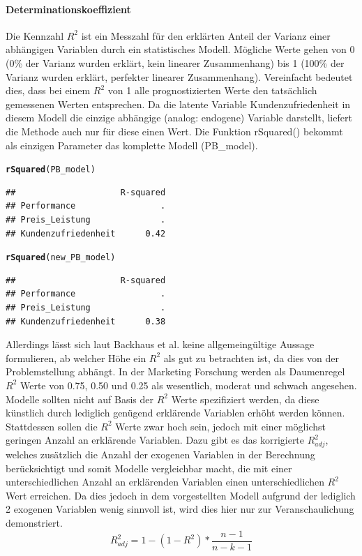 \documentclass{article}\usepackage[]{graphicx}\usepackage[]{color}
\makeatletter
\newcommand{\hlstd}[1]{\textcolor[rgb]{0.345,0.345,0.345}{#1}}%
\newcommand{\hlkwd}[1]{\textcolor[rgb]{0.737,0.353,0.396}{\textbf{#1}}}%
\newenvironment{kframe}{%
 \def\at@end@of@kframe{}%
 \ifinner\ifhmode%
  \def\at@end@of@kframe{\end{minipage}}%
  \begin{minipage}{\columnwidth}%
 \fi\fi%
 \def\FrameCommand##1{\hskip\@totalleftmargin \hskip-\fboxsep
 \colorbox{shadecolor}{##1}\hskip-\fboxsep
     \hskip-\linewidth \hskip-\@totalleftmargin \hskip\columnwidth}%
 \MakeFramed {\advance\hsize-\width
   \@totalleftmargin\z@ \linewidth\hsize
   \@setminipage}}%
 {\par\unskip\endMakeFramed%
 \at@end@of@kframe}
\newenvironment{knitrout}{}{} %
\makeatother
\begin{document}
\paragraph{Determinationskoeffizient}

Die Kennzahl $R^2$ ist ein Messzahl für den erklärten Anteil der Varianz einer abhängigen Variablen durch ein statistisches Modell. Mögliche Werte gehen von 0 (0\% der Varianz wurden erklärt, kein linearer Zusammenhang) bis 1 (100\% der Varianz wurden erklärt, perfekter linearer Zusammenhang). Vereinfacht bedeutet dies, dass bei einem $R^2$ von 1 alle prognostizierten Werte den tatsächlich gemessenen Werten entsprechen. Da die latente Variable Kundenzufriedenheit in diesem Modell die einzige abhängige (analog: endogene) Variable darstellt, liefert die Methode auch nur für diese einen Wert. Die Funktion rSquared() bekommt als einzigen Parameter das komplette Modell (PB\_model).
\begin{knitrout}
\color{fgcolor}\begin{kframe}
\begin{alltt}
\hlkwd{rSquared}\hlstd{(PB_model)}
\end{alltt}
\begin{verbatim}
##                     R-squared
## Performance                 .
## Preis_Leistung              .
## Kundenzufriedenheit      0.42
\end{verbatim}
\begin{alltt}
\hlkwd{rSquared}\hlstd{(new_PB_model)}
\end{alltt}
\begin{verbatim}
##                     R-squared
## Performance                 .
## Preis_Leistung              .
## Kundenzufriedenheit      0.38
\end{verbatim}
\end{kframe}
\end{knitrout}
Allerdings lässt sich laut Backhaus et al.\cite{backhaus2004industriegutermarketing} keine allgemeingültige Aussage formulieren, ab welcher Höhe ein $R^{2}$ als gut zu betrachten ist, da dies von der Problemstellung abhängt. In der Marketing Forschung werden als Daumenregel $R^{2}$ Werte von 0.75, 0.50 und 0.25 als wesentlich, moderat und schwach angesehen.\cite{hair2011pls,henseler2009use} Modelle sollten nicht auf Basis der $R^{2}$ Werte spezifiziert werden, da diese künstlich durch lediglich genügend erklärende Variablen erhöht werden können. Stattdessen sollen die $R^{2}$ Werte zwar hoch sein, jedoch mit einer möglichst geringen Anzahl an erklärende Variablen. Dazu gibt es das korrigierte $R^{2}_{adj}$, welches zusätzlich die Anzahl der exogenen Variablen in der Berechnung berücksichtigt und somit Modelle vergleichbar macht, die mit einer unterschiedlichen Anzahl an erklärenden Variablen einen unterschiedlichen $R^{2}$ Wert erreichen. Da dies jedoch in dem vorgestellten Modell aufgrund der lediglich 2 exogenen Variablen wenig sinnvoll ist, wird dies hier nur zur Veranschaulichung demonstriert. 
\begin{equation}
 R^{2}_{adj} = 1-(1-R^{2})*\frac{n-1}{n-k-1}
\end{equation}
\end{document}
